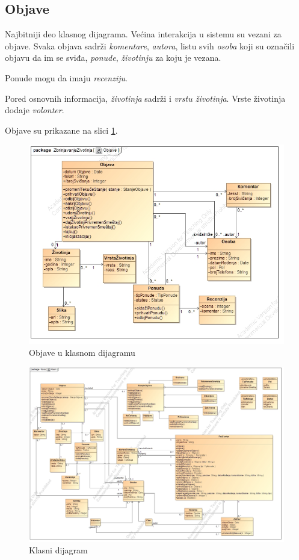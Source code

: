 \subsection{Objave}
\par Najbitniji deo klasnog dijagrama. Većina interakcija u sistemu su vezani za objave. Svaka objava sadrži \textit{komentare}, \textit{autora},
listu svih \textit{osoba} koji su označili objavu da im se sviđa, \textit{ponude}, \textit{životinju} za koju je vezana.
\par Ponude mogu da imaju \textit{recenziju}. 
\par Pored osnovnih informacija, \textit{životinja} sadrži i \textit{vrstu životinja}. Vrste životinja dodaje \textit{volonter}.
\par Objave su prikazane na slici \ref{fig:posts}.
\begin{figure}[h]
    \centering
    \includegraphics[width=\textwidth, height=0.55\textwidth]{img/posts.jpg}
    \caption{Objave u klasnom dijagramu}
    \label{fig:posts}
\end{figure}
\begin{figure}
    \centering
    \includegraphics[width=\textwidth]{img/class.jpg}
    \caption{Klasni dijagram}
    \label{fig:class}
\end{figure}